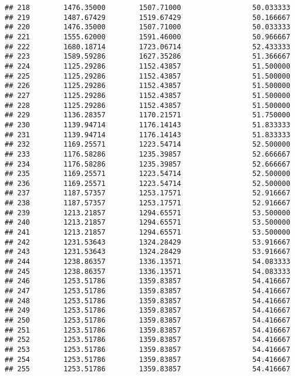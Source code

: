 \documentclass[]{article}
\begin{document}
\begin{verbatim}
## 218        1476.35000        1507.71000                 50.033333
## 219        1487.67429        1519.67429                 50.166667
## 220        1476.35000        1507.71000                 50.033333
## 221        1555.62000        1591.46000                 50.966667
## 222        1680.18714        1723.06714                 52.433333
## 223        1589.59286        1627.35286                 51.366667
## 224        1125.29286        1152.43857                 51.500000
## 225        1125.29286        1152.43857                 51.500000
## 226        1125.29286        1152.43857                 51.500000
## 227        1125.29286        1152.43857                 51.500000
## 228        1125.29286        1152.43857                 51.500000
## 229        1136.28357        1170.21571                 51.750000
## 230        1139.94714        1176.14143                 51.833333
## 231        1139.94714        1176.14143                 51.833333
## 232        1169.25571        1223.54714                 52.500000
## 233        1176.58286        1235.39857                 52.666667
## 234        1176.58286        1235.39857                 52.666667
## 235        1169.25571        1223.54714                 52.500000
## 236        1169.25571        1223.54714                 52.500000
## 237        1187.57357        1253.17571                 52.916667
## 238        1187.57357        1253.17571                 52.916667
## 239        1213.21857        1294.65571                 53.500000
## 240        1213.21857        1294.65571                 53.500000
## 241        1213.21857        1294.65571                 53.500000
## 242        1231.53643        1324.28429                 53.916667
## 243        1231.53643        1324.28429                 53.916667
## 244        1238.86357        1336.13571                 54.083333
## 245        1238.86357        1336.13571                 54.083333
## 246        1253.51786        1359.83857                 54.416667
## 247        1253.51786        1359.83857                 54.416667
## 248        1253.51786        1359.83857                 54.416667
## 249        1253.51786        1359.83857                 54.416667
## 250        1253.51786        1359.83857                 54.416667
## 251        1253.51786        1359.83857                 54.416667
## 252        1253.51786        1359.83857                 54.416667
## 253        1253.51786        1359.83857                 54.416667
## 254        1253.51786        1359.83857                 54.416667
## 255        1253.51786        1359.83857                 54.416667

\end{verbatim}
\end{document}
